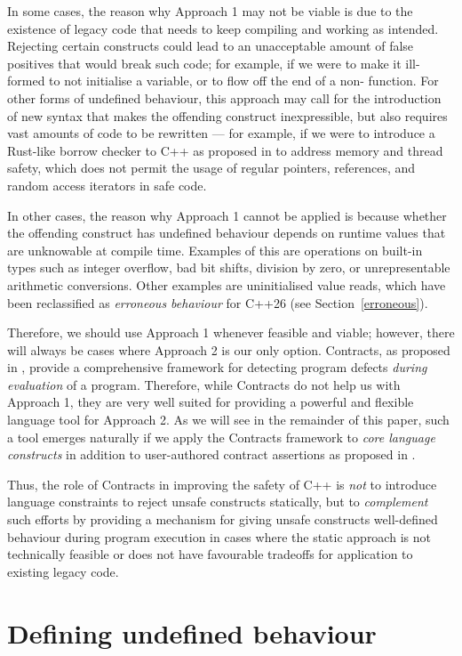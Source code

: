 In some cases, the reason why Approach 1 may not be viable is due to the existence of legacy code that needs to keep compiling and working as intended. Rejecting certain constructs could lead to an unacceptable amount of false positives that would break such code; for example, if we were to make it ill-formed to not initialise a variable, or to flow off the end of a non- function. For other forms of undefined behaviour, this approach may call for the introduction of new syntax that makes the offending construct inexpressible, but also requires vast amounts of code to be rewritten --- for example, if we were to introduce a Rust-like borrow checker to C++ as proposed in \cite{} to address memory and thread safety, which does not permit the usage of regular pointers, references, and random access iterators in safe code.

In other cases, the reason why Approach 1 cannot be applied is because whether the offending construct has undefined behaviour depends on runtime values that are unknowable at compile time. Examples of this are operations on built-in types such as integer overflow, bad bit shifts, division by zero, or unrepresentable arithmetic conversions. Other examples are uninitialised value reads, which have been reclassified as \emph{erroneous behaviour} for C++26 (see Section~\ref{erroneous}).

Therefore, we should use Approach 1 whenever feasible and viable; however, there will always be cases where Approach 2 is our only option. Contracts, as proposed in \cite{P2900R8}, provide a comprehensive framework for detecting program defects \emph{during evaluation} of a program. Therefore, while Contracts do not help us with Approach 1, they are very well suited for providing a powerful and flexible language tool for Approach 2. As we will see in the remainder of this paper, such a tool emerges naturally if we apply the Contracts framework to \emph{core language constructs} in addition to user-authored contract assertions as proposed in \cite{P2900R8}.

Thus, the role of Contracts in improving the safety of C++ is \emph{not} to introduce language constraints to reject unsafe constructs statically, but to \emph{complement} such efforts by providing a mechanism for giving unsafe constructs well-defined behaviour during program execution in cases where the static approach is not technically feasible or does not have favourable tradeoffs for application to existing legacy code.

\section{Defining undefined behaviour}

